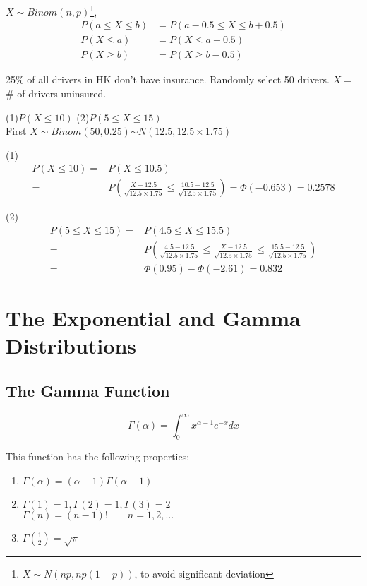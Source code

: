 $X \sim Binom(n,p)$\footnote{$X \sim N(np,np(1-p))$, to avoid significant deviation},
\begin{align*}
P(a \leq X \leq b)&=P(a-0.5 \leq X \leq b+0.5)  \\
P(X \leq a) &= P(X \leq a+0.5)	\\
P(X \geq b) &= P(X \geq b-0.5)
\end{align*}

\begin{exmp}
25\% of all drivers in HK don't have insurance. Randomly select 50 drivers. $X=$ \# of drivers uninsured.

(1)$P(X \leq 10)$ \quad (2)$P(5 \leq X \leq 15)$ \\
First $X\sim Binom(50,0.25) \dot{\sim} N(12.5,12.5\times1.75)$

(1) \begin{align*}
P(X\leq 10) =& P(X \leq 10.5) \\
=& P\left( \frac{X-12.5}{\sqrt{12.5\times1.75}}  \leq   \frac{10.5-12.5}{\sqrt{12.5\times1.75}}\right)=\Phi(-0.653)=0.2578
\end{align*}

(2) \begin{align*}
P(5 \leq X\leq 15) =& P(4.5 \leq X \leq 15.5) \\
=& P\left(\frac{4.5-12.5}{\sqrt{12.5\times1.75}} \leq \frac{X-12.5}{\sqrt{12.5\times1.75}}  \leq   \frac{15.5-12.5}{\sqrt{12.5\times1.75}}\right)	\\
=&\Phi(0.95)-\Phi(-2.61)=0.832
\end{align*}
\end{exmp}

\section{The Exponential and Gamma Distributions}
\subsection{The Gamma Function}
\begin{defn}
\[\Gamma(\alpha)=\int_0^{\infty} x^{\alpha-1}e^{-x} dx\]
\end{defn}

This function has the following properties:
\begin{enumerate}
\item $\Gamma(\alpha)=(\alpha-1)\Gamma(\alpha-1)$
\item $\Gamma(1)=1,\Gamma(2)=1,\Gamma(3)=2$\\
$\Gamma(n)=(n-1)! \qquad n=1,2,\dots$
\item $\Gamma(\frac{1}{2})=\sqrt{\pi}$
\end{enumerate}

